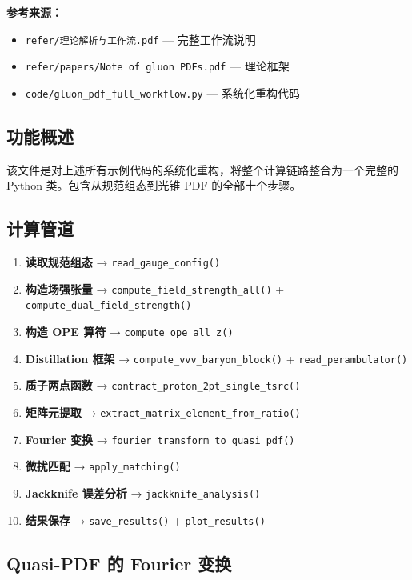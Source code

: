\documentclass[12pt,a4paper]{ctexart}
\begin{document}
\textbf{参考来源：}
\begin{itemize}
    \item \texttt{refer/理论解析与工作流.pdf} — 完整工作流说明
    \item \texttt{refer/papers/Note of gluon PDFs.pdf} — 理论框架
    \item \texttt{code/gluon\_pdf\_full\_workflow.py} — 系统化重构代码
\end{itemize}

\subsection{功能概述}

该文件是对上述所有示例代码的系统化重构，将整个计算链路整合为一个完整的 Python 类。包含从规范组态到光锥 PDF 的全部十个步骤。

\subsection{计算管道}

\begin{enumerate}
    \item \textbf{读取规范组态} → \texttt{read\_gauge\_config()}
    \item \textbf{构造场强张量} → \texttt{compute\_field\_strength\_all()} + \texttt{compute\_dual\_field\_strength()}
    \item \textbf{构造 OPE 算符} → \texttt{compute\_ope\_all\_z()}
    \item \textbf{Distillation 框架} → \texttt{compute\_vvv\_baryon\_block()} + \texttt{read\_perambulator()}
    \item \textbf{质子两点函数} → \texttt{contract\_proton\_2pt\_single\_tsrc()}
    \item \textbf{矩阵元提取} → \texttt{extract\_matrix\_element\_from\_ratio()}
    \item \textbf{Fourier 变换} → \texttt{fourier\_transform\_to\_quasi\_pdf()}
    \item \textbf{微扰匹配} → \texttt{apply\_matching()}
    \item \textbf{Jackknife 误差分析} → \texttt{jackknife\_analysis()}
    \item \textbf{结果保存} → \texttt{save\_results()} + \texttt{plot\_results()}
\end{enumerate}

\subsection{Quasi-PDF 的 Fourier 变换}
\end{document}
